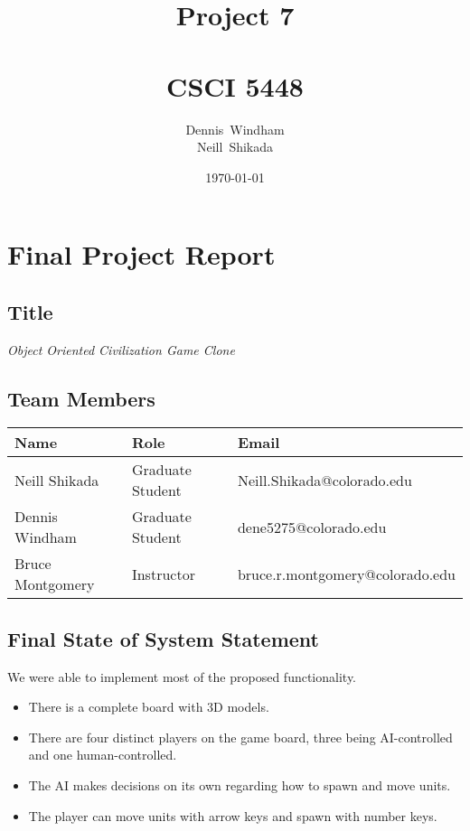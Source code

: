 \documentclass[11pt]{amsart}
\def \fnamea{Dennis}
\def \fnameb{Neill}
\def \lnamea{Windham}
\def \lnameb{Shikada}
\def \class{CSCI 5448}
\def \hwnum{7} %
\def \assgn{Project \hwnum}
\begin{document}
\author[\lnamea]{\fnamea\ \lnamea\\\fnameb\ \lnameb}
\date{\today}
\title[\assgn]{\assgn \\ \ \\\class}
\maketitle
\tableofcontents

\newpage
\section*{\textbf{Final Project Report}}
\subsection*{Title}
\begin{center}
    \textit{Object Oriented Civilization Game Clone}
\end{center}

\subsection*{Team Members} \phantom{}

\begin{table}[htbp]
    \begin{tabularx}{\textwidth}{l|l|l}
        \textbf{Name}    & \textbf{Role}    & \textbf{Email}                  \\
        \hline
        Neill Shikada    & Graduate Student & Neill.Shikada@colorado.edu
        \\
        Dennis Windham   & Graduate Student & dene5275@colorado.edu           \\
        Bruce Montgomery & Instructor       & bruce.r.montgomery@colorado.edu
    \end{tabularx}
\end{table}

\subsection*{Final State of System Statement}
We were able to implement most of the proposed functionality.
\begin{itemize}
    \item There is a complete board with 3D models.
    \item There are four distinct players on the game board, three being AI-controlled and one human-controlled.
    \item The AI makes decisions on its own regarding how to spawn and move units.
    \item The player can move units with arrow keys and spawn with number keys.
\end{itemize}
\end{document}
